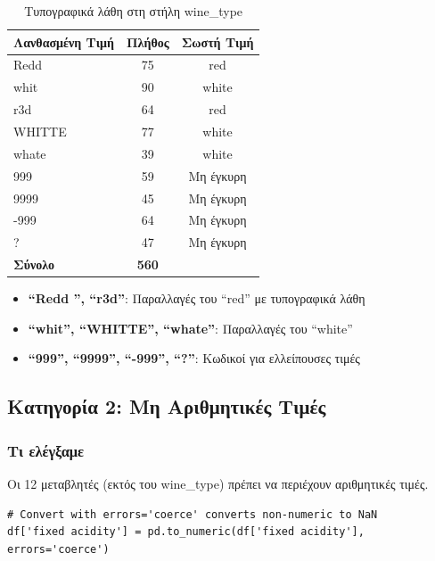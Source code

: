 \documentclass[12pt,a4paper]{article}
\begin{document}
\begin{table}[H]
\centering
\caption{\textgreek{Τυπογραφικά λάθη στη στήλη wine\_type}}
\label{tab:typos}
\begin{tabular}{@{}lcc@{}}
\toprule
\textbf{\textgreek{Λανθασμένη Τιμή}} & \textbf{\textgreek{Πλήθος}} & \textbf{\textgreek{Σωστή Τιμή}} \\
\midrule
Redd  & 75 & red \\
whit & 90 & white \\
r3d & 64 & red \\
WHITTE & 77 & white \\
whate & 39 & white \\
999 & 59 & \textgreek{Μη έγκυρη} \\
9999 & 45 & \textgreek{Μη έγκυρη} \\
-999 & 64 & \textgreek{Μη έγκυρη} \\
? & 47 & \textgreek{Μη έγκυρη} \\
\midrule
\textbf{\textgreek{Σύνολο}} & \textbf{560} & \\
\bottomrule
\end{tabular}
\end{table}

\begin{infobox}
\begin{itemize}
    \item \textbf{``Redd '', ``r3d''}: \textgreek{Παραλλαγές του ``red'' με τυπογραφικά λάθη}
    \item \textbf{``whit'', ``WHITTE'', ``whate''}: \textgreek{Παραλλαγές του ``white''}
    \item \textbf{``999'', ``9999'', ``-999'', ``?''}: \textgreek{Κωδικοί για ελλείπουσες τιμές}
\end{itemize}
\end{infobox}

\subsection{\textgreek{Κατηγορία 2: Μη Αριθμητικές Τιμές}}

\subsubsection{\textgreek{Τι ελέγξαμε}}

\textgreek{Οι 12 μεταβλητές (εκτός του wine\_type) πρέπει να περιέχουν αριθμητικές τιμές.}

\begin{lstlisting}[caption={Convert to numeric}]
# Convert with errors='coerce' converts non-numeric to NaN
df['fixed acidity'] = pd.to_numeric(df['fixed acidity'], errors='coerce')
\end{lstlisting}
\end{document}
